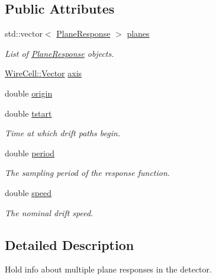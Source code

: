 \subsection*{Public Attributes}
\begin{DoxyCompactItemize}
\item 
std\+::vector$<$ \hyperlink{struct_wire_cell_1_1_response_1_1_schema_1_1_plane_response}{Plane\+Response} $>$ \hyperlink{struct_wire_cell_1_1_response_1_1_schema_1_1_field_response_a14b540e83977b1913ad00391aa719f49}{planes}
\begin{DoxyCompactList}\small\item\em List of \hyperlink{struct_wire_cell_1_1_response_1_1_schema_1_1_plane_response}{Plane\+Response} objects. \end{DoxyCompactList}\item 
\hyperlink{namespace_wire_cell_aa3c82d3ba85f032b0d278b7004846800}{Wire\+Cell\+::\+Vector} \hyperlink{struct_wire_cell_1_1_response_1_1_schema_1_1_field_response_acae15775cad08bcffe0712dd65d1ff09}{axis}
\item 
double \hyperlink{struct_wire_cell_1_1_response_1_1_schema_1_1_field_response_aadaa425d6a5c65ed739a3f3b5f53cdbb}{origin}
\item 
double \hyperlink{struct_wire_cell_1_1_response_1_1_schema_1_1_field_response_ad635ad2311a574c52bf1d4f6375909d5}{tstart}
\begin{DoxyCompactList}\small\item\em Time at which drift paths begin. \end{DoxyCompactList}\item 
double \hyperlink{struct_wire_cell_1_1_response_1_1_schema_1_1_field_response_aabc2db965f6cb2194dea799fe1cffa9f}{period}
\begin{DoxyCompactList}\small\item\em The sampling period of the response function. \end{DoxyCompactList}\item 
double \hyperlink{struct_wire_cell_1_1_response_1_1_schema_1_1_field_response_af7e1b2ede3d1a533db44af94a9cb95d0}{speed}
\begin{DoxyCompactList}\small\item\em The nominal drift speed. \end{DoxyCompactList}\end{DoxyCompactItemize}


\subsection{Detailed Description}
Hold info about multiple plane responses in the detector. 

